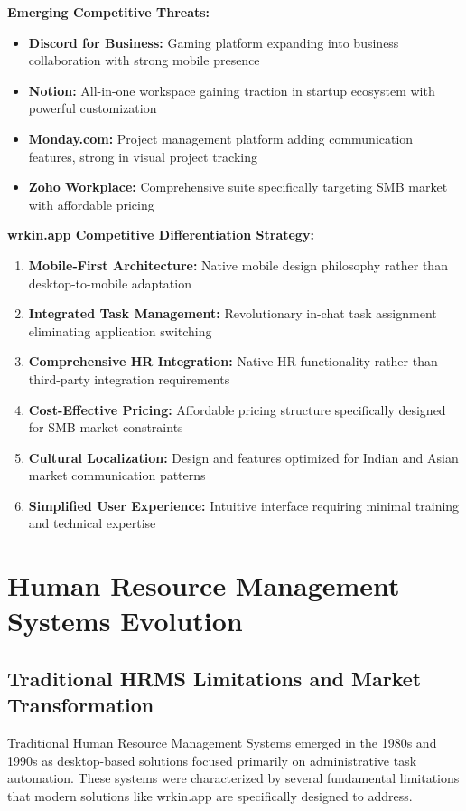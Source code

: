 \textbf{Emerging Competitive Threats:}
\begin{itemize}
    \item \textbf{Discord for Business:} Gaming platform expanding into business collaboration with strong mobile presence
    \item \textbf{Notion:} All-in-one workspace gaining traction in startup ecosystem with powerful customization
    \item \textbf{Monday.com:} Project management platform adding communication features, strong in visual project tracking
    \item \textbf{Zoho Workplace:} Comprehensive suite specifically targeting SMB market with affordable pricing
\end{itemize}

\textbf{wrkin.app Competitive Differentiation Strategy:}
\begin{enumerate}
    \item \textbf{Mobile-First Architecture:} Native mobile design philosophy rather than desktop-to-mobile adaptation
    \item \textbf{Integrated Task Management:} Revolutionary in-chat task assignment eliminating application switching
    \item \textbf{Comprehensive HR Integration:} Native HR functionality rather than third-party integration requirements
    \item \textbf{Cost-Effective Pricing:} Affordable pricing structure specifically designed for SMB market constraints
    \item \textbf{Cultural Localization:} Design and features optimized for Indian and Asian market communication patterns
    \item \textbf{Simplified User Experience:} Intuitive interface requiring minimal training and technical expertise
\end{enumerate}

\section{Human Resource Management Systems Evolution}

\subsection{Traditional HRMS Limitations and Market Transformation}

Traditional Human Resource Management Systems emerged in the 1980s and 1990s as desktop-based solutions focused primarily on administrative task automation. These systems were characterized by several fundamental limitations that modern solutions like wrkin.app are specifically designed to address.

